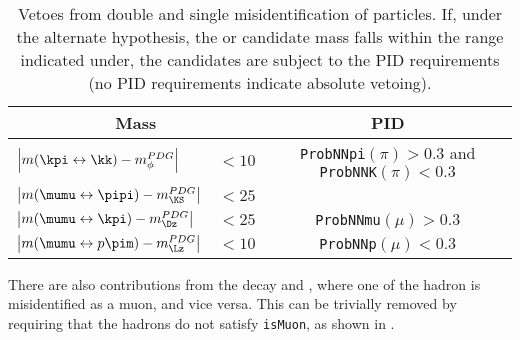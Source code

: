 \begin{table}
  \caption{\small
   Vetoes from double and single misidentification of particles.
    If, under the alternate hypothesis, the \db or \Kstarz candidate mass falls within the range
    indicated under, the candidates are subject to the PID requirements (no PID requirements
    indicate absolute vetoing).
  }
  \label{tab:bkg:vetoes}
  \begin{center}
    \begin{tabular}{lcc}\toprule
      \multicolumn{2}{c}{Mass} & PID \\\midrule
      $\left|m(\kpi\leftrightarrow\kk) - m^{PDG}_\phi\right|$ & $<10$
      & {\tt ProbNNpi$(\pi)>0.3$} and {\tt ProbNNK$(\pi)<0.3$}\\
      $\left|m(\mumu\leftrightarrow\pipi) - m^{PDG}_{\KS}\right|$ & $<25$ &  \\
      $\left|m(\mumu\leftrightarrow\kpi) - m^{PDG}_{\Dz}\right|$& $<25$ & {\tt ProbNNmu$(\mu)>0.3$} \\
      $\left|m(\mumu\leftrightarrow p\pim) - m^{PDG}_{\Lz}\right|$& $<10$
      & {\tt ProbNNp$(\mu)<0.3$}  \\\bottomrule
    \end{tabular}
  \end{center}
\end{table}

There are also contributions from the decay \decay{\Bd}{\jpsi\Kstarz} and \decay{\jpsi}{\mumu},
where one of the hadron is misidentified as a muon, and vice versa.
This can be trivially removed by requiring that the hadrons do not satisfy {\tt isMuon}, as shown
in .


